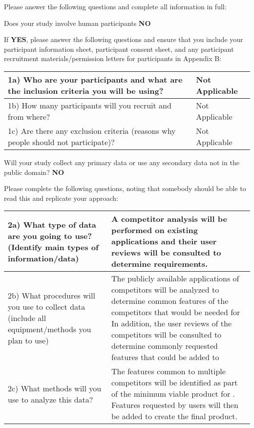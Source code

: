 \documentclass[../CHEFCookingHelperForEveryonesFridge.tex]{subfiles}
\begin{document}
Please answer the following questions and complete all information in full:

Does your study involve human participants \textbf{NO}


If \textbf{YES}, please answer the following questions and ensure that you include your participant
information sheet, participant consent sheet, and any participant recruitment materials/permission
letters for participants in Appendix B:

\begin{table}[H]
    \begin{tabulary}{\textwidth}{|L|L|}
        \hline
        1a) Who are your participants and what are the inclusion criteria you will be using? & Not Applicable \\\hline
        1b) How many participants will you recruit and from where? & Not Applicable \\\hline
        1c) Are there any exclusion criteria (reasons why people should not participate)? & Not Applicable \\\hline
    \end{tabulary}
\end{table}

Will your study collect any primary data or use any secondary data not in the public domain? \textbf{NO}

Please complete the following questions, noting that somebody should be able to read this and replicate your approach:

\begin{table}[H]
    \begin{tabulary}{\textwidth}{|L|L|}
        \hline
        2a) What type of data are you going to use? (Identify main types of information/data)
            &
        A competitor analysis will be performed on existing applications and their user reviews will be consulted to determine requirements.
            \\\hline
        2b) What procedures will you use to collect data (include all equipment/methods you plan to use)
            &
        The publicly available applications of competitors will be analyzed to determine common features of the competitors that would be needed for \chef{}
        In addition, the user reviews of the competitors will be consulted to determine commonly requested features that could be added to \chef{}
            \\\hline
        2c) What methods will you use to analyze this data?
            &
        The features common to multiple competitors will be identified as part of the minimum viable product for \chef{}.
        Features requested by users will then be added to create the final product.
            \\\hline
    \end{tabulary}
\end{table}
\end{document}
